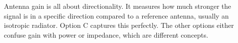 Antenna gain is all about directionality. It measures how much stronger the signal is in a specific direction compared to a reference antenna, usually an isotropic radiator. Option C captures this perfectly. The other options either confuse gain with power or impedance, which are different concepts.
